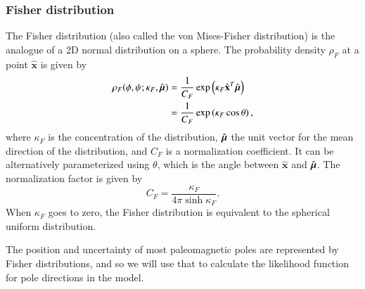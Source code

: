 \documentclass[preprint,12pt,authoryear]{elsarticle}
\newcommand{\mitbf}[1]{\hbox{\mathversion{bold}$#1$}}
\begin{document}
\subsubsection{Fisher distribution}
The Fisher distribution (also called the von Mises-Fisher distribution) is the analogue
of a 2D normal distribution on a sphere.
The probability density $\rho_F$ at a point $\hat{\mathbf{x}}$ is given by
\begin{equation}
  \begin{aligned}
  \rho_F(\phi, \psi ; \kappa_F, \hat{\mitbf{\mu}}) 
  &= \frac{1}{C_F} \exp \left( \kappa_F \hat{\mathbf{x}}^T \hat{\mitbf{\mu}} \right) \\
  &= \frac{1}{C_F} \exp \left( \kappa_F \cos \theta \right),
  \end{aligned}
\end{equation}
where $\kappa_F$ is the concentration of the distribution, 
$\hat{\mitbf{\mu}}$ the unit vector for the mean direction of the distribution, 
and $C_F$ is a normalization coefficient. It can be alternatively
parameterized using $\theta$, which is the angle between $\hat{\mathbf{x}}$ and $\hat{\mitbf{\mu}}$.
The normalization factor is given by 
\begin{equation}
  C_F = \frac{\kappa_F}{4 \pi \sinh{\kappa_F}}.
\end{equation}
When $\kappa_F$ goes to zero, the Fisher distribution is equivalent to the spherical uniform distribution.

The position and uncertainty of most paleomagnetic poles are represented by Fisher distributions,
and so we will use that to calculate the likelihood function for pole directions in the model.
\end{document}
